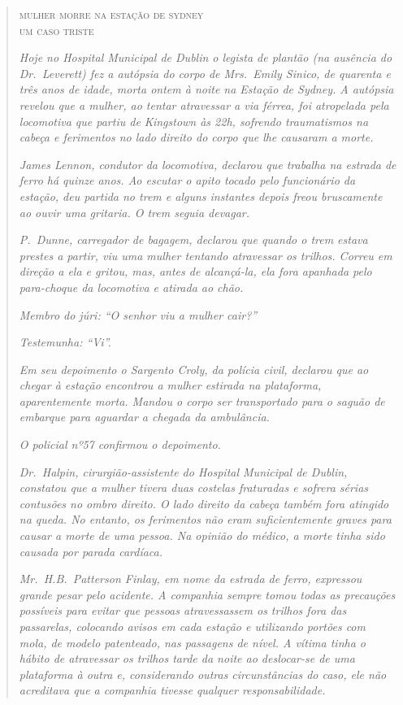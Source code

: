 \begin{quote}
{\centering \textsc{mulher morre na estação de sydney}\\
\textsc{um caso triste}\par}

\medskip

\textit{Hoje no Hospital Municipal de Dublin o legista de plantão (na
ausência do Dr.~Leverett) fez a autópsia do corpo de Mrs.~Emily
Sinico, de quarenta e três anos de idade, morta ontem à noite
na Estação de Sydney.  A autópsia revelou que a mulher, ao tentar
atravessar a via férrea, foi atropelada pela locomotiva que
partiu de Kingstown às 22h, sofrendo traumatismos na
cabeça e ferimentos no lado direito do corpo que lhe causaram a morte.}

\textit{James Lennon, condutor da locomotiva, declarou que trabalha na
estrada de ferro há quinze anos.  Ao escutar o apito tocado pelo
funcionário da estação, deu partida no trem e alguns
instantes depois freou bruscamente ao ouvir uma gritaria.  O
trem seguia devagar.}

\textit{P.~Dunne, carregador de bagagem, declarou que quando o trem
estava prestes a partir, viu uma mulher tentando atravessar os
trilhos.  Correu em direção a ela e gritou, mas, antes de alcançá-la,
ela fora apanhada pelo para-choque da locomotiva e atirada ao chão.}

\textit{Membro do júri: “O senhor viu a mulher cair?”}

\textit{Testemunha: “Vi”.}

\textit{Em seu depoimento o Sargento Croly, da polícia civil, declarou que ao
chegar à estação encontrou a mulher estirada na plataforma,
aparentemente morta.  Mandou o corpo ser transportado para o saguão
de embarque para aguardar a chegada da ambulância.}

\textit{O policial nº57 confirmou o depoimento.}

\textit{Dr.~Halpin, cirurgião-assistente do Hospital Municipal de Dublin,
constatou que a mulher tivera duas costelas fraturadas e sofrera
sérias contusões no ombro direito.  O lado direito da cabeça
também fora atingido na queda.  No entanto, os ferimentos não eram
suficientemente graves para causar a morte de uma pessoa.  Na
opinião do médico, a morte tinha sido causada por parada cardíaca.}

\textit{Mr.~H.B.~Patterson Finlay, em nome da estrada de ferro,
expressou grande pesar pelo acidente.  A companhia sempre tomou todas
as precauções possíveis para evitar que pessoas atravessassem os
trilhos fora das passarelas, colocando avisos em cada estação e
utilizando portões com mola, de modelo patenteado, nas
passagens de nível.  A vítima tinha o hábito de atravessar os
trilhos tarde da noite ao deslocar-se de uma plataforma à outra e,
considerando outras circunstâncias do caso, ele não acreditava
que a companhia tivesse qualquer responsabilidade.}


\end{quote}
